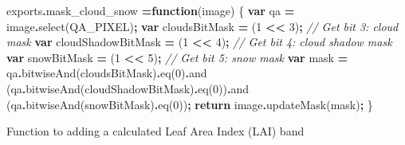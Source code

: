 \documentclass[
]{article}
\newenvironment{Shaded}{\begin{snugshade}}{\end{snugshade}}
\newcommand{\AttributeTok}[1]{\textcolor[rgb]{0.77,0.63,0.00}{#1}}
\newcommand{\CommentTok}[1]{\textcolor[rgb]{0.56,0.35,0.01}{\textit{#1}}}
\newcommand{\ControlFlowTok}[1]{\textcolor[rgb]{0.13,0.29,0.53}{\textbf{#1}}}
\newcommand{\DecValTok}[1]{\textcolor[rgb]{0.00,0.00,0.81}{#1}}
\newcommand{\FunctionTok}[1]{\textcolor[rgb]{0.00,0.00,0.00}{#1}}
\newcommand{\KeywordTok}[1]{\textcolor[rgb]{0.13,0.29,0.53}{\textbf{#1}}}
\newcommand{\NormalTok}[1]{#1}
\newcommand{\OperatorTok}[1]{\textcolor[rgb]{0.81,0.36,0.00}{\textbf{#1}}}
\newcommand{\StringTok}[1]{\textcolor[rgb]{0.31,0.60,0.02}{#1}}
\begin{document}
\begin{Shaded}
\begin{Highlighting}[]
\NormalTok{exports}\OperatorTok{.}\AttributeTok{mask\_cloud\_snow} \OperatorTok{=}\KeywordTok{function}\NormalTok{(image) \{}
    \KeywordTok{var}\NormalTok{ qa }\OperatorTok{=}\NormalTok{ image}\OperatorTok{.}\FunctionTok{select}\NormalTok{(}\StringTok{\textquotesingle{}QA\_PIXEL\textquotesingle{}}\NormalTok{)}\OperatorTok{;} 
    \KeywordTok{var}\NormalTok{ cloudsBitMask }\OperatorTok{=}\NormalTok{ (}\DecValTok{1} \OperatorTok{\textless{}\textless{}} \DecValTok{3}\NormalTok{)}\OperatorTok{;} \CommentTok{// Get bit 3: cloud mask}
    \KeywordTok{var}\NormalTok{ cloudShadowBitMask }\OperatorTok{=}\NormalTok{ (}\DecValTok{1} \OperatorTok{\textless{}\textless{}} \DecValTok{4}\NormalTok{)}\OperatorTok{;} \CommentTok{// Get bit 4: cloud shadow mask}
    \KeywordTok{var}\NormalTok{ snowBitMask }\OperatorTok{=}\NormalTok{ (}\DecValTok{1} \OperatorTok{\textless{}\textless{}} \DecValTok{5}\NormalTok{)}\OperatorTok{;} \CommentTok{// Get bit 5: snow mask}
    \KeywordTok{var}\NormalTok{ mask }\OperatorTok{=}\NormalTok{ qa}\OperatorTok{.}\FunctionTok{bitwiseAnd}\NormalTok{(cloudsBitMask)}\OperatorTok{.}\FunctionTok{eq}\NormalTok{(}\DecValTok{0}\NormalTok{)}\OperatorTok{.}\AttributeTok{and}
\NormalTok{          (qa}\OperatorTok{.}\FunctionTok{bitwiseAnd}\NormalTok{(cloudShadowBitMask)}\OperatorTok{.}\FunctionTok{eq}\NormalTok{(}\DecValTok{0}\NormalTok{))}\OperatorTok{.}\AttributeTok{and}
\NormalTok{          (qa}\OperatorTok{.}\FunctionTok{bitwiseAnd}\NormalTok{(snowBitMask)}\OperatorTok{.}\FunctionTok{eq}\NormalTok{(}\DecValTok{0}\NormalTok{))}\OperatorTok{;}
\ControlFlowTok{return}\NormalTok{ image}\OperatorTok{.}\FunctionTok{updateMask}\NormalTok{(mask)}\OperatorTok{;}
\NormalTok{\}}
\end{Highlighting}
\end{Shaded}

Function to adding a calculated Leaf Area Index (LAI) band
\end{document}
